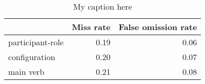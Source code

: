 \begin{table}[!ht]
\centering
\begin{tabular}{lrr}
\toprule
{} &  Miss rate &  False omission rate \\
\midrule
participant-role &       0.19 &                 0.06 \\
configuration    &       0.20 &                 0.07 \\
main verb        &       0.21 &                 0.08 \\
\bottomrule
\end{tabular}
\caption{My caption here}
\label{tab:unit-elements-transitivity-combined-errors}
\end{table}